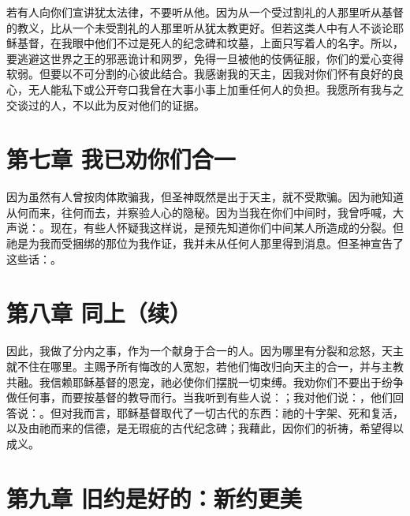 若有人向你们宣讲犹太法律，不要听从他。因为从一个受过割礼的人那里听从基督的教义，比从一个未受割礼的人那里听从犹太教更好。但若这类人中有人不谈论耶稣基督，在我眼中他们不过是死人的纪念碑和坟墓，上面只写着人的名字。所以，要逃避这世界之王的邪恶诡计和网罗，免得一旦被他的伎俩征服，你们的爱心变得软弱。但要以不可分割的心彼此结合。我感谢我的天主，因我对你们怀有良好的良心，无人能私下或公开夸口我曾在大事小事上加重任何人的负担。我愿所有我与之交谈过的人，不以此为反对他们的证据。\par


\section{第七章 我已劝你们合一}

因为虽然有人曾按肉体欺骗我，但圣神既然是出于天主，就不受欺骗。因为祂知道从何而来，往何而去，并察验人心的隐秘。因为当我在你们中间时，我曾呼喊，大声说：。现在，有些人怀疑我这样说，是预先知道你们中间某人所造成的分裂。但祂是为我而受捆绑的那位为我作证，我并未从任何人那里得到消息。但圣神宣告了这些话：。\par


\section{第八章 同上（续）}

因此，我做了分内之事，作为一个献身于合一的人。因为哪里有分裂和忿怒，天主就不住在哪里。主赐予所有悔改的人宽恕，若他们悔改归向天主的合一，并与主教共融。我信赖耶稣基督的恩宠，祂必使你们摆脱一切束缚。我劝你们不要出于纷争做任何事，而要按基督的教导而行。当我听到有些人说：；我对他们说：，他们回答说：。但对我而言，耶稣基督取代了一切古代的东西：祂的十字架、死和复活，以及由祂而来的信德，是无瑕疵的古代纪念碑；我藉此，因你们的祈祷，希望得以成义。\par


\section{第九章 旧约是好的：新约更美}

